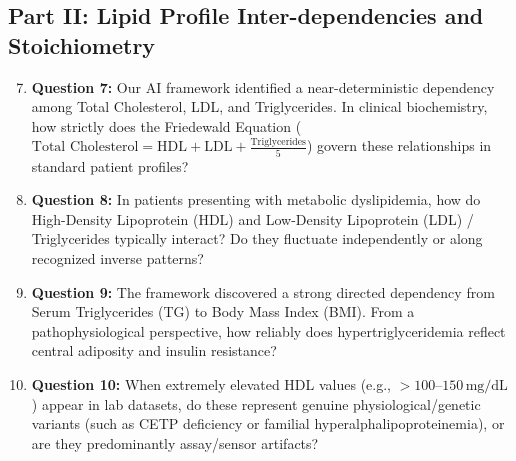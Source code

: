 \documentclass[MTech]{ugthesis}
\begin{document}
\begin{appendices}
\section*{Part II: Lipid Profile Inter-dependencies and Stoichiometry}
\begin{enumerate}\setcounter{enumi}{6}
    \item \textbf{Question 7:} Our AI framework identified a near-deterministic dependency among Total Cholesterol, LDL, and Triglycerides. In clinical biochemistry, how strictly does the Friedewald Equation ($\text{Total Cholesterol} = \text{HDL} + \text{LDL} + \frac{\text{Triglycerides}}{5}$) govern these relationships in standard patient profiles?
    \item \textbf{Question 8:} In patients presenting with metabolic dyslipidemia, how do High-Density Lipoprotein (HDL) and Low-Density Lipoprotein (LDL) / Triglycerides typically interact? Do they fluctuate independently or along recognized inverse patterns?
    \item \textbf{Question 9:} The framework discovered a strong directed dependency from Serum Triglycerides (TG) to Body Mass Index (BMI). From a pathophysiological perspective, how reliably does hypertriglyceridemia reflect central adiposity and insulin resistance?
    \item \textbf{Question 10:} When extremely elevated HDL values (e.g., $> 100\text{--}150\,\text{mg/dL}$) appear in lab datasets, do these represent genuine physiological/genetic variants (such as CETP deficiency or familial hyperalphalipoproteinemia), or are they predominantly assay/sensor artifacts?
\end{enumerate}


\end{appendices}
\end{document}
